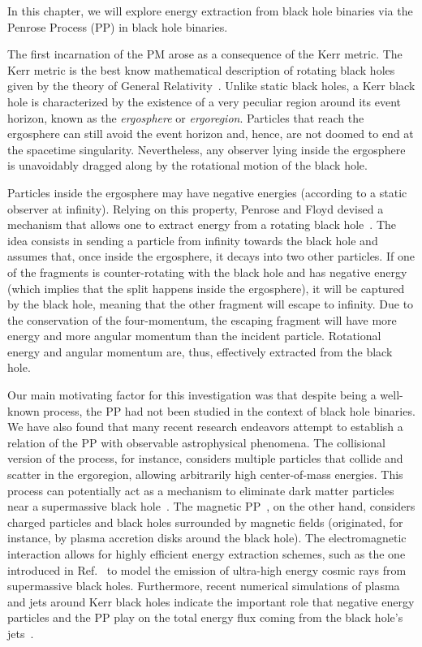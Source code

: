 In this chapter, we will explore energy extraction from black hole binaries via the Penrose Process (PP) in black hole binaries.

The first incarnation of the PM arose as a consequence of the Kerr metric. The Kerr metric is the best know mathematical description of rotating black holes given by the theory of General Relativity~\cite{Visser:2007fj,Bambi:2011mj,Teukolsky:2014vca,berti}. Unlike static black holes, a Kerr black hole is characterized by the existence of a very peculiar region around its event horizon, known as the \emph{ergosphere} or \emph{ergoregion}. Particles that reach the ergosphere can still avoid the event horizon and, hence, are not doomed to end at the spacetime singularity. Nevertheless, any observer lying inside the ergosphere is unavoidably dragged along by the rotational motion of the black hole.

Particles inside the ergosphere may have negative energies (according to a static observer at infinity). Relying on this property, Penrose and Floyd devised a mechanism that allows one to extract energy from a rotating black hole~\cite{PENROSE1971}. The idea consists in sending a particle from infinity towards the black hole and assumes that, once inside the ergosphere, it decays into two other particles. If one of the fragments is counter-rotating with the black hole and has negative energy (which implies that the split happens inside the ergosphere), it will be captured by the black hole, meaning that the other fragment will escape to infinity. Due to the conservation of the four-momentum, the escaping fragment will have more energy and more angular momentum than the incident particle. Rotational energy and angular momentum are, thus, effectively extracted from the black hole.

Our main motivating factor for this investigation was that despite being a well-known process, the PP had not been studied in the context of black hole binaries. We have also found that many recent research endeavors attempt to establish a relation of the PP with observable astrophysical phenomena. The collisional version of the process, for instance, considers multiple particles that collide and scatter in the ergoregion, allowing  arbitrarily high center-of-mass energies. This process can potentially act as a mechanism to eliminate dark matter particles near a supermassive black hole~\cite{Schnittman:2018ccg}. The magnetic PP~\cite{Wagh1985,Tursunov:2019oiq}, on the other hand, considers charged particles and black holes surrounded by magnetic fields (originated, for instance, by plasma accretion disks around the black hole). The electromagnetic interaction allows for highly efficient energy extraction schemes, such as the one introduced in Ref.~\cite{Tursunov:2020juz} to model the emission of ultra-high energy cosmic rays from supermassive black holes. Furthermore, recent numerical simulations of plasma and jets around Kerr black holes indicate the important role that negative energy particles and the PP play on the total energy flux coming from the black hole's jets~\cite{Parfrey:2018dnc}.

